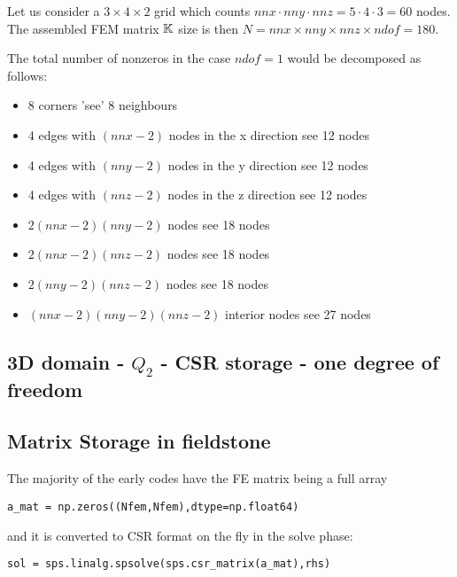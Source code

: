 Let us consider a $3\times4\times2$ grid which counts 
$nnx\cdot nny \cdot nnz = 5 \cdot 4\cdot 3=60$ nodes.
The assembled FEM matrix ${\mathbb{K}}$ size is then 
$N=nnx\times nny\times nnz \times ndof=180$.

\begin{center}

\end{center}



The total number of nonzeros in the case $ndof=1$ would be decomposed as follows:
\begin{itemize}
\item 8 corners 'see' 8 neighbours
\item 4 edges with $(nnx-2)$ nodes in the x direction see 12 nodes
\item 4 edges with $(nny-2)$ nodes in the y direction see 12 nodes
\item 4 edges with $(nnz-2)$ nodes in the z direction see 12 nodes
\item $2(nnx-2)(nny-2)$ nodes see 18 nodes
\item $2(nnx-2)(nnz-2)$ nodes see 18 nodes
\item $2(nny-2)(nnz-2)$ nodes see 18 nodes
\item $(nnx-2)(nny-2)(nnz-2)$ interior nodes see 27 nodes
\end{itemize}

\subsection{3D domain - $Q_2$ - CSR storage - one degree of freedom}


\begin{center}

\end{center}





\subsection{Matrix Storage in fieldstone}

The majority of the early codes have the FE matrix being a full array
\begin{lstlisting}
a_mat = np.zeros((Nfem,Nfem),dtype=np.float64) 
\end{lstlisting}
and it is converted to CSR format on the fly in the solve phase:
\begin{lstlisting}
sol = sps.linalg.spsolve(sps.csr_matrix(a_mat),rhs)
\end{lstlisting}

